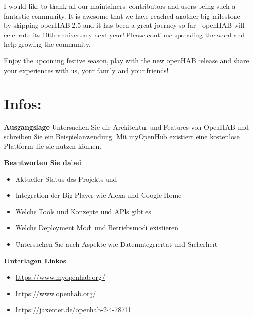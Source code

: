 I would like to thank all our maintainers, contributors and users being such a fantastic community. It is awesome that we have reached another big milestone by shipping openHAB 2.5 and it has been a great journey so far - openHAB will celebrate its 10th anniversary next year! Please continue spreading the word and help growing the community.

Enjoy the upcoming festive season, play with the new openHAB release and share your experiences with us, your family and your friends!


\section{Infos:}
\textbf{Ausgangslage}
Untersuchen Sie die Architektur und Features von OpenHAB und
schreiben Sie ein Beispielanwendung.
Mit myOpenHub existiert eine kostenlose Plattform die sie nutzen
können.

\textbf{Beantworten Sie dabei}
\begin{itemize}
 \item Aktueller Status des Projekts und  
 \item Integration der Big Player wie Alexa und Google Home
 \item Welche Tools und Konzepte und APIs gibt es
 \item Welche Deployment Modi und Betriebsmodi existieren
 \item Untersuchen Sie auch Aspekte wie Datenintegriertät und Sicherheit
\end{itemize}

\textbf{Unterlagen Linkes}
\begin{itemize}
	\item \url{https://www.myopenhab.org/}
	\item \url{https://www.openhab.org/}
	\item \url{https://jaxenter.de/openhab-2-4-78711}
\end{itemize}

